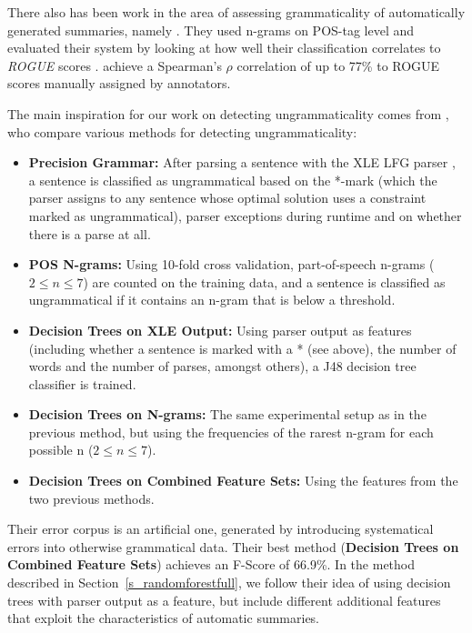 \documentclass[a4paper,10pt]{scrartcl}
\theoremstyle{style}
\begin{document}
There also has been work in the area of assessing grammaticality of automatically generated summaries, namely \cite{vadlapudi2010automated}. They used n-grams on POS-tag level and evaluated their system by looking at how well their classification correlates to \textit{ROGUE} scores \citep{lin2004rouge}. \citeauthor{vadlapudi2010automated} achieve a Spearman's $\rho{}$ correlation of up to 77\% to ROGUE scores manually assigned by annotators.

The main inspiration for our work on detecting ungrammaticality comes from \cite{wagner2007comparative}, who compare various methods for detecting ungrammaticality:

\begin{itemize}
	\item \textbf{Precision Grammar:} After parsing a sentence with the XLE LFG parser \citep{maxwell1996efficient}, a sentence is classified as ungrammatical based on the *-mark (which the parser assigns to any sentence whose optimal solution uses a constraint marked as ungrammatical), parser exceptions during runtime and on whether there is a parse at all.
	\item \textbf{POS N-grams:} Using 10-fold cross validation, part-of-speech n-grams ($2 \leq n \leq 7$) are counted on the training data, and a sentence is classified as ungrammatical if it contains an n-gram that is below a threshold.
	\item \textbf{Decision Trees on XLE Output:} Using parser output as features (including whether a sentence is marked with a * (see above), the number of words and the number of parses, amongst others), a J48 decision tree classifier is trained.
	\item \textbf{Decision Trees on N-grams:} The same experimental setup as in the previous method, but using the frequencies of the rarest n-gram for each possible n ($2 \leq n \leq 7$).
	\item \textbf{Decision Trees on Combined Feature Sets:} Using the features from the two previous methods.
\end{itemize}

Their error corpus is an artificial one, generated by introducing systematical errors into otherwise grammatical data. Their best method (\textbf{Decision Trees on Combined Feature Sets}) achieves an F-Score of 66.9\%. In the method described in Section~\ref{s_randomforestfull}, we follow their idea of using decision trees with parser output as a feature, but include different additional features that exploit the characteristics of automatic summaries.
\end{document}

